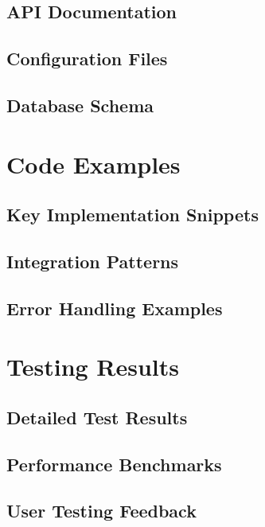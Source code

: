 \documentclass[12pt,a4paper]{report}
\begin{document}
\section{API Documentation}
\section{Configuration Files}
\section{Database Schema}

\chapter{Code Examples}
\section{Key Implementation Snippets}
\section{Integration Patterns}
\section{Error Handling Examples}

\chapter{Testing Results}
\section{Detailed Test Results}
\section{Performance Benchmarks}
\section{User Testing Feedback}
\end{document}
